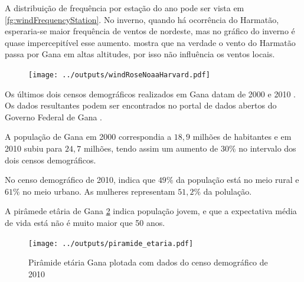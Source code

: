 A distribuição de frequência por estação do ano pode ser vista em 
\ref{fg:windFrequencyStation}. 
No inverno, quando há ocorrência do Harmatão, esperaria-se maior
frequência de ventos de nordeste, mas no gráfico do inverno é quase 
impercepitível esse aumento. \citep{breuning2005} mostra que na 
verdade o vento do Harmatão passa por Gana em altas altitudes, por isso
não influência os ventos locais. 

\begin{figure}[H]
  \centering
  \texttt{[image: ../outputs/windRoseNoaaHarvard.pdf]}
  \caption{ \citep{carslaw2012} \label{fig:windRose_full}}
\end{figure}


Os últimos dois censos demográficos realizados em Gana datam
de 2000 \citep{ghanacensus2003} e 2010 \citep{ghanacensus2013}. Os
dados resultantes podem ser encontrados no portal de dados abertos
do Governo Federal de Gana \citep{opendataghana}.

A população de Gana em 2000 correspondia a $18,9$ milhões 
de habitantes e em 2010 subiu para $24,7$ milhões, tendo assim
um aumento de $30\%$ no intervalo dos dois censos demográficos.

No censo demográfico de 2010, indica que $49\%$ da população está 
no meio rural e $61\%$ no meio urbano. As mulheres representam 
$51,2\%$ da polulação.

A pirâmede etâria de Gana \ref{fig:piramedegana} indica população jovem, 
e que a expectativa média de vida está não é muito maior que 50 anos. 

\begin{figure}[H]
\begin{center}
  \texttt{[image: ../outputs/piramide\_etaria.pdf]}
  \caption{Pirâmide etária Gana plotada com dados do censo 
           demográfico de 2010 \citep{ghanacensus2013} \label{fig:piramedegana}}
\end{center}
\end{figure}

